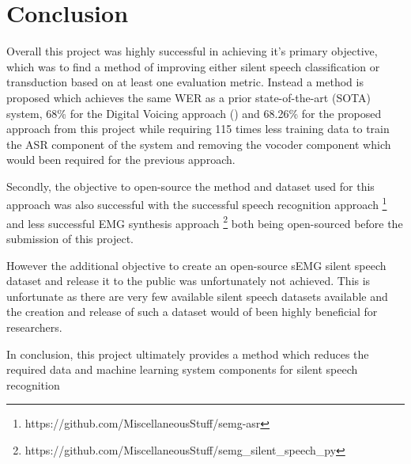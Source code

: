 \chapter{Conclusion} \label{chap:conclusion}

Overall this project was highly successful in achieving it's primary objective,
which was to find a method of improving either silent speech classification
or transduction based on at least one evaluation metric. Instead a method is
proposed which achieves the same WER as a prior state-of-the-art (SOTA)
system, 68\% for the Digital Voicing approach (\cite{gaddy2020digital})
and 68.26\% for the proposed approach from this project while requiring
115 times less training data to train the ASR component of the system
and removing the vocoder component which would been required for the
previous approach.

Secondly, the objective to open-source the method and dataset used for
this approach was also successful with the successful
speech recognition approach
\footnote{https://github.com/MiscellaneousStuff/semg-asr}
and less successful EMG synthesis approach
\footnote{https://github.com/MiscellaneousStuff/semg\_silent\_speech\_py}
both being open-sourced before the submission of this project.

However the additional objective to create an open-source sEMG silent
speech dataset and release it to the public was unfortunately not achieved.
This is unfortunate as there are very few available silent speech datasets
available and the creation and release of such a dataset would of been
highly beneficial for researchers.

In conclusion, this project ultimately provides a method which reduces
the required data and machine learning system components for silent
speech recognition